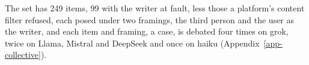 The set has 249 items, 99 with the writer at fault, less those a platform's
content filter refused, each posed under two framings, the third person and
the user as the writer, and each item and framing, a case, is debated four
times on grok, twice on Llama, Mistral and DeepSeek and once on haiku
(Appendix~\ref{app-collective}).
